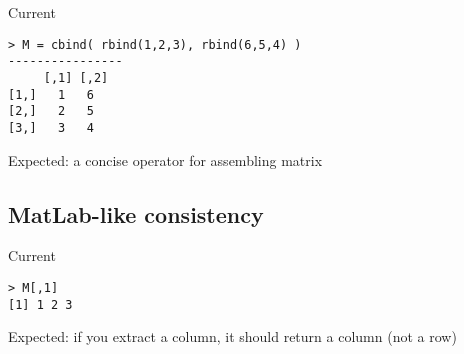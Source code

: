 Current
\begin{lstlisting}
> M = cbind( rbind(1,2,3), rbind(6,5,4) )
----------------
     [,1] [,2]
[1,]   1   6
[2,]   2   5
[3,]   3   4
\end{lstlisting}
Expected: a concise operator for assembling matrix

\subsection{MatLab-like consistency}
\label{sec:matl-like-cons}

Current
\begin{lstlisting}
> M[,1]
[1] 1 2 3
\end{lstlisting}
Expected: if you extract a column, it should return a column (not a row)



